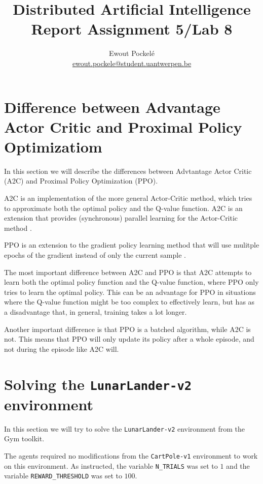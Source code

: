 \documentclass{article}
\title{Distributed Artificial Intelligence \\ \large{Report Assignment 5/Lab 8}}
\author{Ewout Pockelé \\ \href{mailto:ewout.pockele@student.uantwerpen.be}{ewout.pockele@student.uantwerpen.be}}
\begin{document}
 \maketitle

 \tableofcontents

 \section[Difference between A2C and PPO]{Difference between Advantage Actor 
   Critic and Proximal Policy Optimizatiom}
  In this section we will describe the differences between Advtantage Actor 
  Critic (A2C) and Proximal Policy Optimization (PPO).

  A2C is an implementation of the more general Actor-Critic method, which tries
  to approximate both the optimal policy and the Q-value function.  A2C is an
  extension that provides (synchronous) parallel learning for the Actor-Critic
  method \cite[p.~62]{mets-policy-gradient}.

  PPO is an extension to the gradient policy learning method that will use
  mulitple epochs of the gradient instead of only the current sample
  \cite[p.~64]{mets-policy-gradient}.

  The most important difference between A2C and PPO is that A2C attempts to
  learn both the optimal policy function and the Q-value function, where PPO
  only tries to learn the optimal policy.  This can be an advantage for PPO in
  situations where the Q-value function might be too complex to effectively
  learn, but has as a disadvantage that, in general, training takes a lot
  longer.

  Another important difference is that PPO is a batched algorithm, while A2C is
  not.  This means that PPO will only update its policy after a whole episode,
  and not during the episode like A2C will.

 \section{Solving the \texttt{LunarLander-v2} environment}
  In this section we will try to solve the \texttt{LunarLander-v2} environment
  from the Gym toolkit\cite{gym}.

  The agents required no modifications from the \texttt{CartPole-v1}
  environment to work on this environment.  As instructed, the variable
  \texttt{N\_TRIALS} was set to $1$ and the variable \texttt{REWARD\_THRESHOLD}
  was set to $100$.
\end{document}
